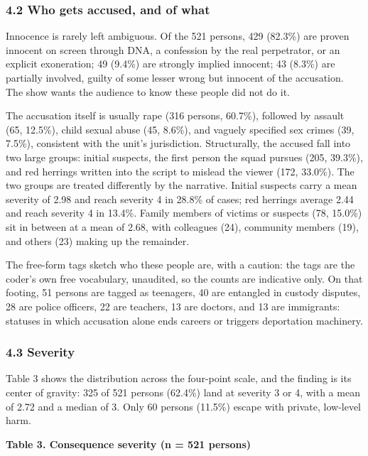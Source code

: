 \documentclass[
]{article}
\begin{document}
\subsubsection{4.2 Who gets accused, and of
what}\label{who-gets-accused-and-of-what}

Innocence is rarely left ambiguous. Of the 521 persons, 429 (82.3\%) are
proven innocent on screen through DNA, a confession by the real
perpetrator, or an explicit exoneration; 49 (9.4\%) are strongly implied
innocent; 43 (8.3\%) are partially involved, guilty of some lesser wrong
but innocent of the accusation. The show wants the audience to know
these people did not do it.

The accusation itself is usually rape (316 persons, 60.7\%), followed by
assault (65, 12.5\%), child sexual abuse (45, 8.6\%), and vaguely
specified sex crimes (39, 7.5\%), consistent with the unit's
jurisdiction. Structurally, the accused fall into two large groups:
initial suspects, the first person the squad pursues (205, 39.3\%), and
red herrings written into the script to mislead the viewer (172,
33.0\%). The two groups are treated differently by the narrative.
Initial suspects carry a mean severity of 2.98 and reach severity 4 in
28.8\% of cases; red herrings average 2.44 and reach severity 4 in
13.4\%. Family members of victims or suspects (78, 15.0\%) sit in
between at a mean of 2.68, with colleagues (24), community members (19),
and others (23) making up the remainder.

The free-form tags sketch who these people are, with a caution: the tags
are the coder's own free vocabulary, unaudited, so the counts are
indicative only. On that footing, 51 persons are tagged as teenagers, 40
are entangled in custody disputes, 28 are police officers, 22 are
teachers, 13 are doctors, and 13 are immigrants: statuses in which
accusation alone ends careers or triggers deportation machinery.

\subsubsection{4.3 Severity}\label{severity}

Table 3 shows the distribution across the four-point scale, and the
finding is its center of gravity: 325 of 521 persons (62.4\%) land at
severity 3 or 4, with a mean of 2.72 and a median of 3. Only 60 persons
(11.5\%) escape with private, low-level harm.

\textbf{Table 3. Consequence severity (n = 521 persons)}
\end{document}
